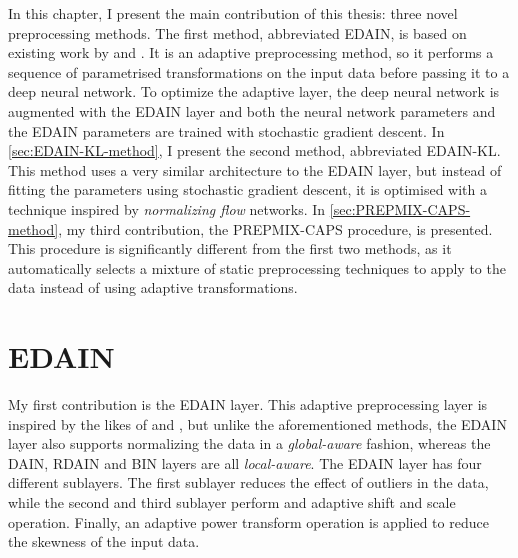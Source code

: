 \documentclass{statsmsc}
\begin{document}
{%
In this chapter, I present the main contribution of this thesis: three novel
preprocessing methods. The first method, abbreviated \acs{EDAIN}, is based on
existing work by \citeauthor{dain} and \citeauthor{bin}. It is an adaptive
preprocessing method, so it performs a sequence of parametrised transformations
on the input data before passing it to a deep neural network. To optimize the
adaptive layer, the deep neural network is augmented with the \acs{EDAIN} layer
and both the neural network parameters and the \acs{EDAIN} parameters are
trained with stochastic gradient descent.  In \cref{sec:EDAIN-KL-method}, I
present the second method, abbreviated \acs{EDAIN-KL}.  This method uses a very
similar architecture to the \acs{EDAIN} layer, but instead of fitting the
parameters using stochastic gradient descent, it is optimised with a technique
inspired by \textit{normalizing flow} networks. In
\cref{sec:PREPMIX-CAPS-method}, my third contribution, the \acs{PREPMIX-CAPS}
procedure, is presented. This procedure is significantly different from the
first two methods, as it automatically selects a mixture of static
preprocessing techniques to apply to the data instead of using adaptive
transformations.


\section{EDAIN}%
\label{sec:EDAIN-method}


My first contribution is the \acf{EDAIN} layer. This adaptive preprocessing layer is inspired
by the likes of \cite{dain}  and \cite{bin}, but unlike the aforementioned methods, the
\ac{EDAIN} layer also supports normalizing the data in a \textit{global-aware} fashion, whereas
the \ac{DAIN}, \ac{RDAIN} and \ac{BIN} layers are all \textit{local-aware}.
The \ac{EDAIN} layer has four different sublayers. The first sublayer reduces the effect of
outliers in the data, while the second and third sublayer perform and adaptive shift and
scale operation. Finally, an adaptive power transform operation is applied to reduce the
skewness of the input data.

}
\end{document}
